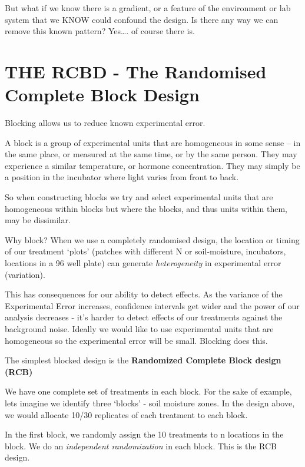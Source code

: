 \documentclass[
]{book}
\begin{document}
But what if we know there is a gradient, or a feature of the environment or lab system that we KNOW could confound the design. Is there any way we can remove this known pattern? Yes\ldots. of course there is.

\hypertarget{the-rcbd---the-randomised-complete-block-design}{%
\section{THE RCBD - The Randomised Complete Block Design}\label{the-rcbd---the-randomised-complete-block-design}}

Blocking allows us to reduce known experimental error.

A block is a group of experimental units that are homogeneous in some sense -- in the same place, or measured at the same time, or by the same person. They may experience a similar temperature, or hormone concentration. They may simply be a position in the incubator where light varies from front to back.

So when constructing blocks we try and select experimental units that are homogeneous within blocks but where the blocks, and thus units within them, may be dissimilar.

Why block? When we use a completely randomised design, the location or timing of our treatment `plots' (patches with different N or soil-moisture, incubators, locations in a 96 well plate) can generate \emph{heterogeneity} in experimental error (variation).

This has consequences for our ability to detect effects. As the variance of the Experimental Error increases, confidence intervals get wider and the power of our analysis decreases - it's harder to detect effects of our treatments against the background noise. Ideally we would like to use experimental units that are homogeneous so the experimental error will be small. Blocking does this.

The simplest blocked design is the \textbf{Randomized Complete Block design (RCB)}

We have one complete set of treatments in each block. For the sake of example, lets imagine we identify three `blocks' - soil moisture zones. In the design above, we would allocate 10/30 replicates of each treatment to each block.

In the first block, we randomly assign the 10 treatments to n locations in the block. We do an \emph{independent randomization} in each block. This is the RCB design.
\end{document}

